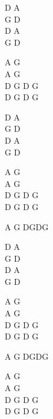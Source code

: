 \begin{chord}
    D A\\
    G D\\
    D A\\
    G D 

    A G\\
    A G \\
    D G D G\\
    D G D G 

    D A\\
    G D\\
    D A \\
    G D 

    A G\\
    A G \\
    D G D G \\
    D G D G 

    A G DGDG

    D A\\
    G D\\
    D A \\
    G D 

    A G\\
    A G \\
    D G D G \\
    D G D G 

    A G DGDG

    A G\\
    A G \\
    D G D G \\
    D G D G 
\end{chord}